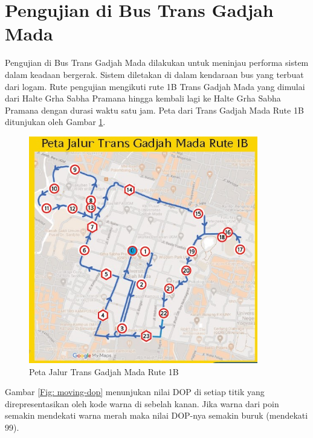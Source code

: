 \section{Pengujian di Bus Trans Gadjah Mada}
Pengujian di Bus Trans Gadjah Mada dilakukan untuk meninjau performa sistem dalam keadaan bergerak. Sistem diletakan di dalam kendaraan bus yang terbuat dari logam. Rute pengujian mengikuti rute 1B Trans Gadjah Mada yang dimulai dari Halte Grha Sabha Pramana hingga kembali lagi ke Halte Grha Sabha Pramana dengan durasi waktu satu jam. Peta dari Trans Gadjah Mada Rute 1B ditunjukan oleh Gambar \ref{Fig: peta-1b}.

\begin{figure}[H]
	\centering
	\includegraphics[width=10cm]{contents/chapter-4/pengujian-bergerak/Peta-Jalur-Rute-1B.jpg}
	\caption{Peta Jalur Trans Gadjah Mada Rute 1B}
	\label{Fig: peta-1b}
\end{figure}

Gambar \ref{Fig: moving-dop} menunjukan nilai DOP di setiap titik yang direpresentasikan oleh kode warna di sebelah kanan. Jika warna dari poin semakin mendekati warna merah maka nilai DOP-nya semakin buruk (mendekati 99). 

